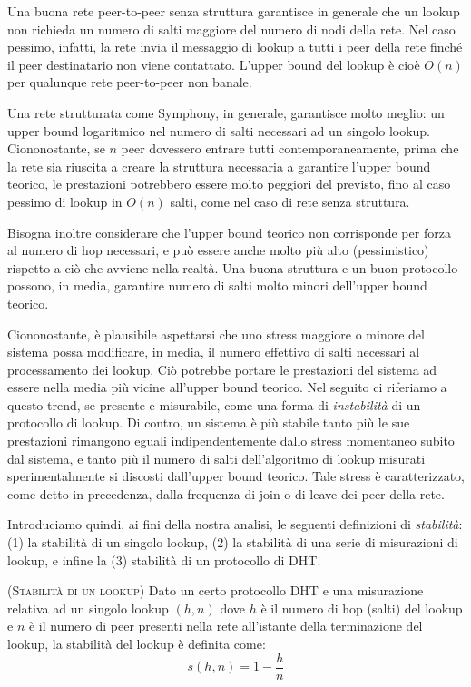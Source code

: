 \documentclass[prodmode,acmtap]{acmlarge}
\begin{document}
Una buona rete peer-to-peer senza struttura garantisce in generale che un lookup non richieda un numero di salti maggiore del numero di nodi della rete. Nel caso pessimo, infatti, la rete invia il messaggio di lookup a tutti i peer della rete finché il peer destinatario non viene contattato. L'upper bound del lookup è cioè $O(n)$ per qualunque rete peer-to-peer non banale.

Una rete strutturata come Symphony, in generale, garantisce molto meglio: un upper bound logaritmico nel numero di salti necessari ad un singolo lookup.
Ciononostante, se $n$ peer dovessero entrare tutti contemporaneamente, prima che la rete sia riuscita a creare la struttura necessaria a garantire l'upper bound teorico, le prestazioni potrebbero essere molto peggiori del previsto, fino al caso pessimo di lookup in $O(n)$ salti, come nel caso di rete senza struttura.

Bisogna inoltre considerare che l'upper bound teorico non corrisponde per forza al numero di hop necessari, e può essere anche molto più alto (pessimistico) rispetto a ciò che avviene nella realtà. Una buona struttura e un buon protocollo possono, in media, garantire numero di salti molto minori dell'upper bound teorico.

Ciononostante, è plausibile aspettarsi che uno stress maggiore o minore del sistema possa modificare, in media, il numero effettivo di salti necessari al processamento dei lookup. Ciò potrebbe portare le prestazioni del sistema ad essere nella media più vicine all'upper bound teorico. Nel seguito ci riferiamo a questo trend, se presente e misurabile, come una forma di \emph{instabilità} di un protocollo di lookup. Di contro, un sistema è più stabile tanto più le sue prestazioni rimangono eguali indipendentemente dallo stress momentaneo subito dal sistema, e tanto più il numero di salti dell'algoritmo di lookup misurati sperimentalmente si discosti dall'upper bound teorico. Tale stress è caratterizzato, come detto in precedenza, dalla frequenza di join o di leave dei peer della rete.

Introduciamo quindi, ai fini della nostra analisi, le seguenti definizioni di \emph{stabilità}: (1) la stabilità di un singolo lookup, (2) la stabilità di una serie di misurazioni di lookup, e infine la (3) stabilità di un protocollo di DHT.

\begin{definition}{(\textsc{Stabilità di un lookup})} \label{eq:stab}
Dato un certo protocollo DHT e una misurazione relativa ad un singolo lookup $(h,n)$ dove $h$ è il numero di hop (salti) del lookup e $n$ è il numero di peer presenti nella rete all'istante della terminazione del lookup, la stabilità del lookup è definita come:
$$ s(h,n) = 1 - \frac{h}{n} $$
\end{definition}
\end{document}
